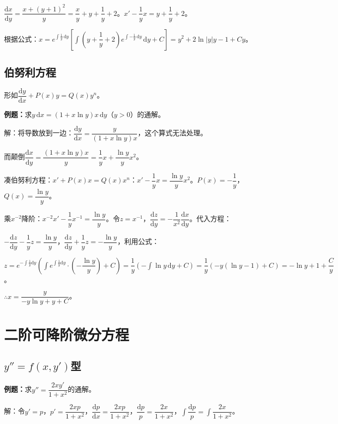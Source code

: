 $\dfrac{\textrm{d}x}{\textrm{d}y}=\dfrac{x+(y+1)^2}{y}=\dfrac{x}{y}+y+\dfrac{1}{y}+2$。$x'-\dfrac{1}{y}x=y+\dfrac{1}{y}+2$。

根据公式：$x=e^{\int\frac{1}{y}\,\textrm{d}y}\left[\displaystyle{\int\left(y+\dfrac{1}{y}+2\right)}e^{\int-\frac{1}{y}\,\textrm{d}y}\,\textrm{d}y+C\right]=y^2+2\ln\vert y\vert y-1+Cy$。

\subsection{伯努利方程}

形如$\dfrac{\textrm{d}y}{\textrm{d}x}+P(x)y=Q(x)y^n$。

\textbf{例题：}求$y\,\textrm{d}x=(1+x\ln y)x\,\textrm{d}y$（$y>0$）的通解。

解：将导数放到一边：$\dfrac{\textrm{d}y}{\textrm{d}x}=\dfrac{y}{(1+x\ln y)x}$，这个算式无法处理。

而颠倒$\dfrac{\textrm{d}x}{\textrm{d}y}=\dfrac{(1+x\ln y)x}{y}=\dfrac{1}{y}x+\dfrac{\ln y}{y}x^2$。

凑伯努利方程：$x'+P(x)x=Q(x)x^n$：$x'-\dfrac{1}{y}x=\dfrac{\ln y}{y}x^2$。$P(x)=-\dfrac{1}{y}$，$Q(x)=\dfrac{\ln y}{y}$。

乘$x^{-2}$降阶：$x^{-2}x'-\dfrac{1}{y}x^{-1}=\dfrac{\ln y}{y}$。令$z=x^{-1}$，$\dfrac{\textrm{d}z}{\textrm{d}y}=-\dfrac{1}{x^2}\dfrac{\textrm{d}x}{\textrm{d}y}$。代入方程：

$-\dfrac{\textrm{d}z}{\textrm{d}y}-\dfrac{1}{y}z=\dfrac{\ln y}{y}$，$\dfrac{\textrm{d}z}{\textrm{d}y}+\dfrac{1}{y}z=-\dfrac{\ln y}{y}$，利用公式：

$z=e^{-\int\frac{1}{y}\textrm{d}y}\left(\displaystyle{\int e^{\int\frac{1}{y}\textrm{d}y}\cdot\left(-\dfrac{\ln y}{y}\right)+C}\right)=\dfrac{1}{y}(-\int\ln y\,\textrm{d}y+C)=\dfrac{1}{y}(-y(\ln y-1)+C)=-\ln y+1+\dfrac{C}{y}$。

$\therefore x=\dfrac{y}{-y\ln y+y+C}$。

\section{二阶可降阶微分方程}

\subsection{\texorpdfstring{$y''=f(x,y')$}\ 型}

\textbf{例题：}求$y''=\dfrac{2xy'}{1+x^2}$的通解。

解：令$y'=p$，$p'=\dfrac{2xp}{1+x^2}$，$\dfrac{\textrm{d}p}{\textrm{d}x}=\dfrac{2xp}{1+x^2}$，$\dfrac{\textrm{d}p}{p}=\dfrac{2x}{1+x^2}$，$\displaystyle{\int\dfrac{\textrm{d}p}{p}=\int\dfrac{2x}{1+x^2}}$。


